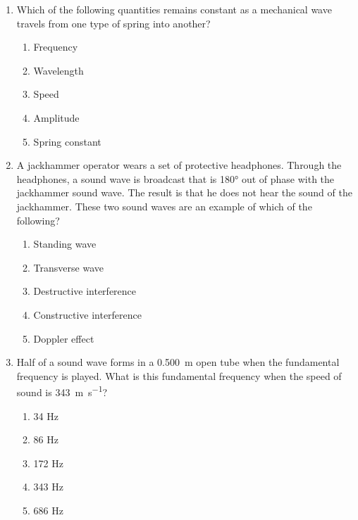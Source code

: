 \documentclass{../../../oss-classkick}
\begin{document}
\begin{multicols}{2}
\begin{enumerate}[leftmargin=18pt]
  \item Which of the following quantities remains constant as a mechanical
    wave travels from one type of spring into another?
    \begin{enumerate}[nosep,leftmargin=18pt,label=(\Alph*)]
    \item Frequency
    \item Wavelength
    \item Speed
    \item Amplitude
    \item Spring constant
    \end{enumerate}
    \vspace{.7in}
    
  \item A jackhammer operator wears a set of protective headphones. Through the
    headphones, a sound wave is broadcast that is \ang{180} out of phase with
    the jackhammer sound wave. The result is that he does not hear the sound of
    the jackhammer. These two sound waves are an example of which of the
    following?
    \begin{enumerate}[nosep,leftmargin=18pt,label=(\Alph*)]
    \item Standing wave
    \item Transverse wave
    \item Destructive interference
    \item Constructive interference
    \item Doppler effect
    \end{enumerate}
    \vspace{.7in}
    
  \item Half of a sound wave forms in a \SI{.500}{\metre} open tube when the
    fundamental frequency is played. What is this fundamental frequency
    when the speed of sound is \SI{343}{\metre\per\second}?
    \begin{enumerate}[nosep,leftmargin=18pt,label=(\Alph*)]
    \item 34 Hz
    \item 86 Hz
    \item 172 Hz
    \item 343 Hz
    \item 686 Hz
    \end{enumerate}
    \columnbreak
    

\end{enumerate}
\end{multicols}
\end{document}
